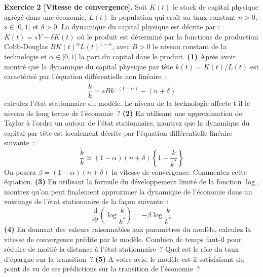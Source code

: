 \documentclass[12pt,a4paper,notitlepage,twocolumn]{article}
\begin{document}
\noindent \textbf{Exercice 2 [Vitesse de convergence].} Soit $K(t)$
le stock de capital physique agrégé dans une économie, $L(t)$ la
population qui croît au taux constant $n>0$, $s \in ]0,1[$ et
$\delta>0$. La dynamique du capital physique est décrite par :
$\dot{K}(t)=sY-\delta K(t)$ où le produit est déterminé par la
fonctions de production Cobb-Douglas $B
K(t)^{\alpha}L(t)^{1-\alpha}$, avec $B>0$ le niveau constant de la
technologie et $\alpha \in ]0,1[$ la part du capital dans le
produit. \textbf{(1)} Après avoir montré que la dynamique du capital
physique par tête $k(t)=K(t)/L(t)$ est caractérisé par l'équation
différentielle non linéaire~:
\[
\frac{\dot{k}}{k} = s B k^{-(1-\alpha)}-(n+\delta)
\]
calculez l'état stationnaire du modèle. Le niveau de la technologie
affecte t-il le niveau de long terme de l'économie~? \textbf{(2)} En
utilisant une approximation de Taylor à l'ordre un autour de l'état
stationnaire, montrez que la dynamique du capital par tête est
localement décrite par l'équation différentielle linéaire suivante~:
\[
\frac{\dot{k}}{k} \simeq (1-\alpha)
(n+\delta)\left\{1-\frac{k}{k^{\ast}}\right\}
\]
On posera $\beta = (1-\alpha)(n+\delta)$ la vitesse de convergence.
Commentez cette équation. \textbf{(3)} En utilisant la formule du
développement limité de la fonction $\log$, montrez qu'on peut
finalement approximer la dynamique de l'économie dans un voisinage
de l'état stationnaire de la façon suivante~:
\[
\frac{\mathrm d}{\mathrm dt}\left(\log \frac{k}{k^\ast}\right) =
-\beta \log \frac{k}{k^{\ast}}
\]
\textbf{(4)} En donnant des valeurs raisonnables aux paramètres du
modèle, calculez la vitesse de convergence prédite par le modèle.
Combien de temps faut-il pour réduire de moitié la distance à l'état
stationnaire~? Quel est le rôle du taux d'épargne sur la
transition~? \textbf{(5)} A votre avis, le modèle est-il satisfaisant
du point de vu de ses prédictions sur la transition de l'économie~?

\bigskip
\bigskip
\end{document}
